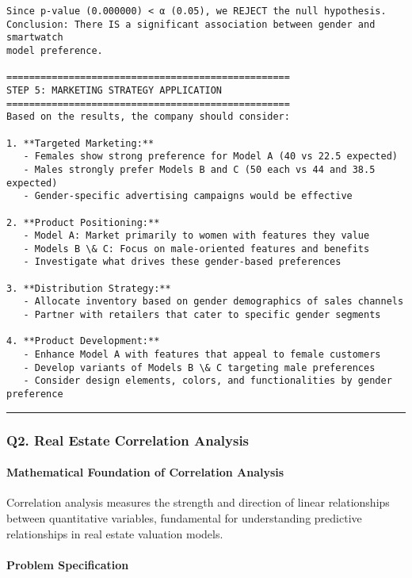 \documentclass[11pt]{article}
\begin{document}
\begin{Verbatim}[commandchars=\\\{\}]
Since p-value (0.000000) < α (0.05), we REJECT the null hypothesis.
Conclusion: There IS a significant association between gender and smartwatch
model preference.

==================================================
STEP 5: MARKETING STRATEGY APPLICATION
==================================================
Based on the results, the company should consider:

1. **Targeted Marketing:**
   - Females show strong preference for Model A (40 vs 22.5 expected)
   - Males strongly prefer Models B and C (50 each vs 44 and 38.5 expected)
   - Gender-specific advertising campaigns would be effective

2. **Product Positioning:**
   - Model A: Market primarily to women with features they value
   - Models B \& C: Focus on male-oriented features and benefits
   - Investigate what drives these gender-based preferences

3. **Distribution Strategy:**
   - Allocate inventory based on gender demographics of sales channels
   - Partner with retailers that cater to specific gender segments

4. **Product Development:**
   - Enhance Model A with features that appeal to female customers
   - Develop variants of Models B \& C targeting male preferences
   - Consider design elements, colors, and functionalities by gender preference
    \end{Verbatim}

    \begin{center}\rule{0.5\linewidth}{0.5pt}\end{center}

\subsubsection{Q2. Real Estate Correlation
Analysis}\label{q2.-real-estate-correlation-analysis}

\paragraph{Mathematical Foundation of Correlation
Analysis}\label{mathematical-foundation-of-correlation-analysis}

Correlation analysis measures the strength and direction of linear
relationships between quantitative variables, fundamental for
understanding predictive relationships in real estate valuation models.

\paragraph{Problem Specification}\label{problem-specification}
\end{document}
